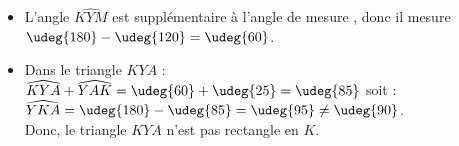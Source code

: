   \begin{itemize}
     \item L'angle $\widehat{KYM}$ est supplémentaire à l'angle de mesure , donc il mesure $\udeg{180}-\udeg{120} =\udeg{60}$.
     \item Dans le triangle $KYA$ : \\
        $\widehat{KYA}+\widehat{YAK} = \udeg{60}+\udeg{25} =\udeg{85}$ soit : \\
        $\widehat{YKA} =\udeg{180}-\udeg{85} =\udeg{95} \neq\udeg{90}$. \\
        Donc, {\red le triangle $KYA$ n'est pas rectangle en $K$}.
  \end{itemize}
  \vspace*{-5mm}
